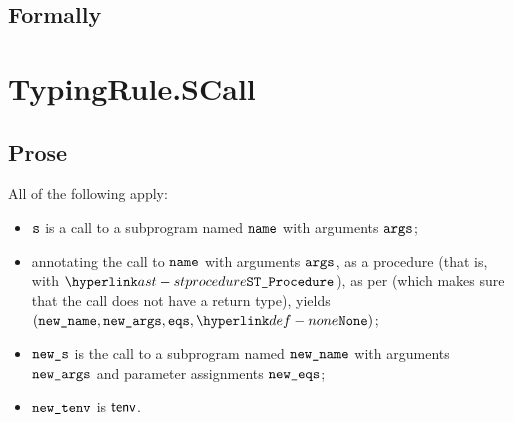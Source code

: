 

\subsection{Formally}
\begin{mathpar}
\end{mathpar}


\section{TypingRule.SCall \label{sec:TypingRule.SCall}}

\subsection{Prose}
All of the following apply:
\begin{itemize}
  \item $\vs$ is a call to a subprogram named $\name$ with arguments $\vargs$;
  \item annotating the call to $\name$ with arguments $\vargs$, as a procedure (that is, with $\STProcedure$),
        as per  (which makes sure that the call does not have a return type),
        yields $(\newname, \newargs, \eqs, \None)$\ProseOrTypeError;
  \item $\news$ is the call to a subprogram named $\newname$ with arguments
        $\newargs$ and parameter assignments $\neweqs$;
  \item $\newtenv$ is $\tenv$.
\end{itemize}



